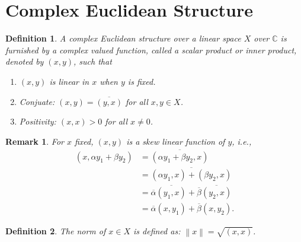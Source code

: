 \documentclass[10pt]{book}
\newtheorem{definition}{Definition}[chapter]
\newtheorem{remark}{Remark}[chapter]
\theoremstyle{definition}
\numberwithin{equation}{chapter}
\begin{document}
\medskip

\section{Complex Euclidean Structure}

\begin{definition}
A complex Euclidean structure over a linear space $X$ over $\mathbb{C}$ is furnished by a complex valued function, called a scalar product or inner product, denoted by $(x,y)$, such that
\begin{enumerate}[label=(\arabic*)]
    \item $(x,y)$ is linear in $x$ when $y$ is fixed.
    \item Conjuate: $(x,y) = \overline{(y,x)}$ for all $x,y\in X$.
    \item Positivity: $(x,x) > 0$ for all $x\neq 0$.
\end{enumerate}
\end{definition}
\begin{remark}
For $x$ fixed, $(x, y)$ is a skew linear function of $y$, i.e.,
\begin{align*}
    (x, \alpha y_1 + \beta y_2) & = \overline{(\alpha y_1 + \beta y_2,x)} \\
    & = \overline{(\alpha y_1,x) + (\beta y_2,x)} \\
    & = \overline{\alpha} \overline{(y_1,x)} + \overline{\beta} \overline{(y_2,x)} \\
    & = \overline{\alpha}(x, y_1) + \overline{\beta}(x, y_2).
\end{align*}
\end{remark}

\medskip

\begin{definition}
The norm of $x\in X$ is defined as: $\left\|x\right\| = \sqrt{(x,x)}$.
\end{definition}

\medskip
\end{document}
